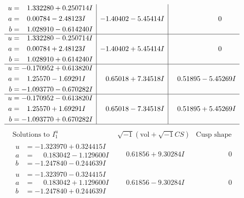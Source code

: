 \documentclass[1p]{elsarticle_modified}
\theoremstyle{definition}
\newcommand{\I}{\sqrt{-1}}
\begin{document}
$$\begin{array}{c|c|c}
\begin{aligned}
u &= \phantom{-}1.332280 + 0.250714 I \\
a &= \phantom{-}0.00784 - 2.48123 I \\
b &= \phantom{-}1.028910 - 0.614240 I\end{aligned}
 & -1.40402 - 5.45414 I & \phantom{-0.000000 } 0 \\ \hline\begin{aligned}
u &= \phantom{-}1.332280 - 0.250714 I \\
a &= \phantom{-}0.00784 + 2.48123 I \\
b &= \phantom{-}1.028910 + 0.614240 I\end{aligned}
 & -1.40402 + 5.45414 I & \phantom{-0.000000 } 0 \\ \hline\begin{aligned}
u &= -0.170952 + 0.613820 I \\
a &= \phantom{-}1.25570 - 1.69291 I \\
b &= -1.093770 - 0.670282 I\end{aligned}
 & \phantom{-}0.65018 + 7.34518 I & \phantom{-}0.51895 - 5.45269 I \\ \hline\begin{aligned}
u &= -0.170952 - 0.613820 I \\
a &= \phantom{-}1.25570 + 1.69291 I \\
b &= -1.093770 + 0.670282 I\end{aligned}
 & \phantom{-}0.65018 - 7.34518 I & \phantom{-}0.51895 + 5.45269 I\\
 \hline 
 \end{array}$$\newpage$$\begin{array}{c|c|c}  
\text{Solutions to }I^u_{1}& \I (\text{vol} + \sqrt{-1}CS) & \text{Cusp shape}\\
 \hline 
\begin{aligned}
u &= -1.323970 + 0.324415 I \\
a &= \phantom{-}0.183042 - 1.129600 I \\
b &= -1.247840 - 0.244639 I\end{aligned}
 & \phantom{-}0.61856 + 9.30284 I & \phantom{-0.000000 } 0 \\ \hline\begin{aligned}
u &= -1.323970 - 0.324415 I \\
a &= \phantom{-}0.183042 + 1.129600 I \\
b &= -1.247840 + 0.244639 I\end{aligned}
 & \phantom{-}0.61856 - 9.30284 I & \phantom{-0.000000 } 0 \\ \hline\begin{aligned}

\end{aligned}
\end{array}$$
\end{document}
